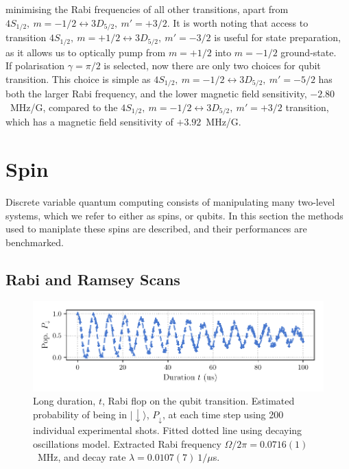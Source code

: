     minimising the Rabi frequencies of all other transitions, apart from
    $4S_{1/2},~m = -1/2 \leftrightarrow 3D_{5/2},~m' = +3/2$.
    It is worth noting that access to transition $4S_{1/2},~m = +1/2 \leftrightarrow 3D_{5/2},~m' = -3/2$ is useful for state preparation, as it allows us to optically pump from $m = +1/2$ into $m = -1/2$ ground-state. \\
    If polarisation $\gamma = \pi/2$ is selected, now there are only two choices for qubit transition. This choice is simple as $4S_{1/2},~m = -1/2 \leftrightarrow 3D_{5/2},~m' = -5/2$ has both the larger Rabi frequency, and the lower magnetic field sensitivity, $-2.80$~MHz/G, compared to the $4S_{1/2},~m = -1/2 \leftrightarrow 3D_{5/2},~m' = +3/2$ transition, which has a magnetic field sensitivity of $+3.92$~MHz/G.\\
    

\section{Spin}
\label{sec:Spin}
    Discrete variable quantum computing consists of manipulating many two-level
    systems, which we refer to either as spins, or qubits. In this section 
    the methods used to maniplate these spins are described, and their
    performances are benchmarked.\\

\subsection{Rabi and Ramsey Scans}
\label{sec:Rabi and Ramsey Scans}

    \begin{figure}
        \begin{center}
        \noindent\includegraphics[width=\linewidth]{
            figures/pdf_figure/long_flop.pdf
            }
        \end{center}
        \caption{Long duration, $t$, Rabi flop on the qubit transition. Estimated probability of being in $|\downarrow\rangle$, $P_\downarrow$, at each time step using 200 individual experimental shots. Fitted dotted line using decaying oscillations model. Extracted Rabi frequency $\Omega/2\pi = 0.0716(1)$~MHz, and decay rate $\lambda = 0.0107(7)~1/\mu$s. 
            }
        \label{fig:Long Flop}
    \end{figure}


